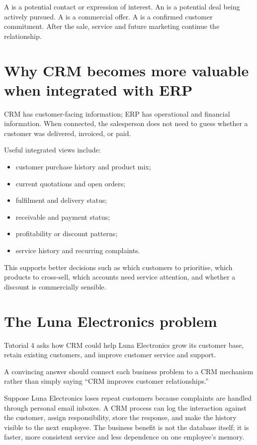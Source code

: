 A  is a potential contact or expression of interest. An  is a potential deal being actively pursued. A  is a commercial offer. A  is a confirmed customer commitment. After the sale, service and future marketing continue the relationship.

\section{Why CRM becomes more valuable when integrated with ERP}

CRM has customer-facing information; ERP has operational and financial information. When connected, the salesperson does not need to guess whether a customer was delivered, invoiced, or paid.

Useful integrated views include:

\begin{itemize}
  \item customer purchase history and product mix;
  \item current quotations and open orders;
  \item fulfilment and delivery status;
  \item receivable and payment status;
  \item profitability or discount patterns;
  \item service history and recurring complaints.
\end{itemize}

This supports better decisions such as which customers to prioritise, which products to cross-sell, which accounts need service attention, and whether a discount is commercially sensible.

\section{The Luna Electronics problem}

Tutorial 4 asks how CRM could help Luna Electronics grow its customer base, retain existing customers, and improve customer service and support.

A convincing answer should connect each business problem to a CRM mechanism rather than simply saying ``CRM improves customer relationships.''

\begin{workedexample}
Suppose Luna Electronics loses repeat customers because complaints are handled through personal email inboxes. A CRM process can log the interaction against the customer, assign responsibility, store the response, and make the history visible to the next employee. The business benefit is not the database itself; it is faster, more consistent service and less dependence on one employee's memory.
\end{workedexample}

